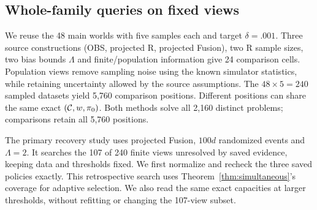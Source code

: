 \subsection{Whole-family queries on fixed views}
We reuse the 48 main worlds with five samples each and target $\delta=.001$. Three source constructions (OBS, projected R, projected Fusion), two R sample sizes, two bias bounds $\Lambda$ and finite/population information give 24 comparison cells. Population views remove sampling noise using the known simulator statistics, while retaining uncertainty allowed by the source assumptions. The $48\times5=240$ sampled datasets yield 5,760 comparison positions. Different positions can share the same exact $(\mathcal{C},w,\pi_0)$. Both methods solve all 2,160 distinct problems; comparisons retain all 5,760 positions.

The primary recovery study uses projected Fusion, $100d$ randomized events and $\Lambda=2$. It searches the 107 of 240 finite views unresolved by saved evidence, keeping data and thresholds fixed. We first normalize and recheck the three saved policies exactly. This retrospective search uses Theorem~\ref{thm:simultaneous}'s coverage for adaptive selection. We also read the same exact capacities at larger thresholds, without refitting or changing the 107-view subset.
